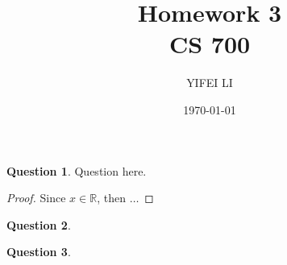 \documentclass[12pt]{amsart}
\title{Homework 3 \\ CS 700}
\author{YIFEI LI}
\date{\today}
\theoremstyle{definition}
\newtheorem{question}{Question}
\theoremstyle{remark}
\theoremstyle{definition}
\newcommand{\mybf}{\mathbb}
\newcommand{\R}{\mybf{R}}
\begin{document}
\maketitle


\begin{question}
 Question here.
 \begin{proof}
     Since $x \in \R$, then $\ldots$
 \end{proof}
\end{question}

\newpage
\begin{question}
    
\end{question}

\newpage
\begin{question}
  
\end{question}
\end{document}
